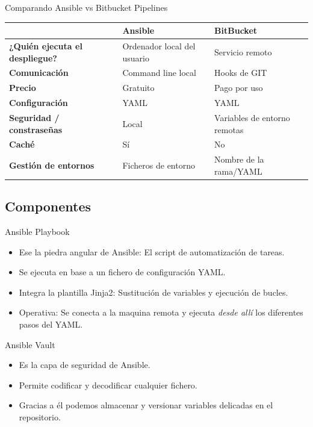 \documentclass[12pt, aspectratio=169]{beamer} %
\begin{document}
\begin{frame}{Comparando Ansible vs Bitbucket Pipelines}

\begin{table}[htbp]
\tiny
\begin{tabular}{|p{4cm}|p{3cm}|p{3cm}|}
\hline
 & \textbf{Ansible} & \textbf{BitBucket} \\ \hline
\textbf{¿Quién ejecuta el despliegue?} & Ordenador local del usuario & Servicio remoto \\ \hline
\textbf{Comunicación} & Command line local & Hooks de GIT \\ \hline
\textbf{Precio} & Gratuito & Pago por uso \\ \hline
\textbf{Configuración}  & YAML & YAML \\ \hline
\textbf{Seguridad / constraseñas} & Local & Variables de entorno remotas \\ \hline
\textbf{Caché} & Sí & No \\ \hline  
\textbf{Gestión de entornos} & Ficheros de entorno & Nombre de la rama/YAML \\ \hline
\end{tabular}
\label{}
\end{table}


\end{frame}

\subsection{Componentes}
\begin{frame}{Ansible Playbook}
  \begin{itemize}
  \item Ese la piedra angular de Ansible: El script de automatización de tareas.
  \item Se ejecuta en base a un fichero de configuración YAML.
  \item Integra la plantilla Jinja2: Sustitución de variables y ejecución de bucles.
  \item Operativa: Se conecta a la maquina remota y ejecuta \textit{desde allí} los diferentes pasos del YAML.
  \end{itemize}
\end{frame}

\begin{frame}{Ansible Vault}
  \begin{itemize}
  \item Es la capa de seguridad de Ansible.
  \item Permite codificar y decodificar cualquier fichero.
  \item Gracias a él podemos almacenar y versionar variables delicadas en el repositorio.
  \end{itemize}
\end{frame}
\end{document}
